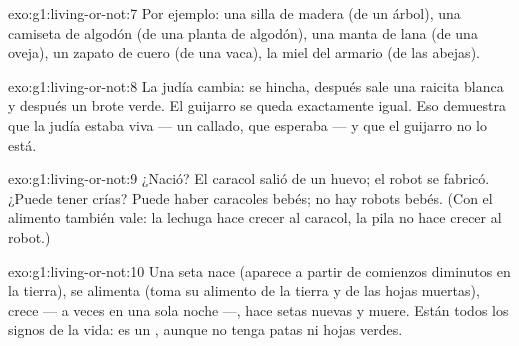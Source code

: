 \begin{solution}{exo:g1:living-or-not:7}
Por ejemplo: una silla de madera (de un árbol), una camiseta de
algodón (de una planta de algodón), una manta de lana (de una oveja),
un zapato de cuero (de una vaca), la miel del armario (de las abejas).
\end{solution}

\begin{solution}{exo:g1:living-or-not:8}
La judía cambia: se hincha, después sale una raicita blanca y después
un brote verde. El guijarro se queda exactamente igual. Eso demuestra
que la judía estaba viva --- un  callado, que esperaba --- y
que el guijarro no lo está.
\end{solution}

\begin{solution}{exo:g1:living-or-not:9}
¿Nació? El caracol salió de un huevo; el robot se fabricó. ¿Puede
tener crías? Puede haber caracoles bebés; no hay robots bebés. (Con
el alimento también vale: la lechuga hace crecer al caracol, la pila
no hace crecer al robot.)
\end{solution}

\begin{solution}{exo:g1:living-or-not:10}
Una seta nace (aparece a partir de comienzos diminutos en la tierra),
se alimenta (toma su alimento de la tierra y de las hojas muertas),
crece --- a veces en una sola noche ---, hace setas nuevas y muere.
Están todos los signos de la vida: es un , aunque no tenga
patas ni hojas verdes.
\end{solution}
